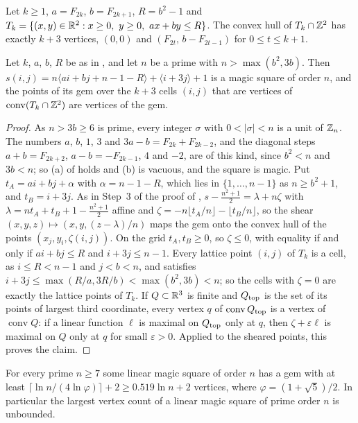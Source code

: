 \begin{lemma}
\label{lem:fib-triangle}
Let $k\ge1$, $a=F_{2k}$, $b=F_{2k+1}$, $R=b^2-1$ and $T_k=\{(x,y)\in\R^2:x\ge0,\ y\ge0,\ ax+by\le R\}$.
The convex hull of $T_k\cap\mathbb{Z}^2$ has exactly $k+3$ vertices, $(0,0)$ and $(F_{2t},\,b-F_{2t-1})$ for $0\le t\le k+1$.
\end{lemma}

\begin{proposition}
\label{prop:many-vertices}
Let $k$, $a$, $b$, $R$ be as in , and let $n$ be a prime with $n>\max(b^2,3b)$.
Then $s(i,j)=n\langle ai+bj+n-1-R\rangle+\langle i+3j\rangle+1$ is a magic square of order $n$, and the points of its gem over the $k+3$ cells $(i,j)$ that are vertices of $\operatorname{conv}(T_k\cap\mathbb{Z}^2)$ are vertices of the gem.
\end{proposition}

\begin{proof}
As $n>3b\ge6$ is prime, every integer $\sigma$ with $0<|\sigma|<n$ is a unit of $\mathbb{Z}_n$.
The numbers $a$, $b$, $1$, $3$ and $3a-b=F_{2k}+F_{2k-2}$, and the diagonal steps $a+b=F_{2k+2}$, $a-b=-F_{2k-1}$, $4$ and $-2$, are of this kind, since $b^2<n$ and $3b<n$; so (a) of  holds and (b) is vacuous, and the square is magic.
Put $t_A=ai+bj+\alpha$ with $\alpha=n-1-R$, which lies in $\{1,\dots,n-1\}$ as $n\ge b^2+1$, and $t_B=i+3j$.
As in Step~3 of the proof of , $s-\frac{n^2+1}2=\lambda+n\zeta$ with $\lambda=nt_A+t_B+1-\frac{n^2+1}2$ affine and $\zeta=-n\lfloor t_A/n\rfloor-\lfloor t_B/n\rfloor$, so the shear $(x,y,z)\mapsto(x,y,(z-\lambda)/n)$ maps the gem onto the convex hull of the points $(x_j,y_i,\zeta(i,j))$.
On the grid $t_A,t_B\ge0$, so $\zeta\le0$, with equality if and only if $ai+bj\le R$ and $i+3j\le n-1$.
Every lattice point $(i,j)$ of $T_k$ is a cell, as $i\le R<n-1$ and $j<b<n$, and satisfies $i+3j\le\max(R/a,3R/b)<\max(b^2,3b)<n$; so the cells with $\zeta=0$ are exactly the lattice points of $T_k$.
If $Q\subset\mathbb{R}^3$ is finite and $Q_{\rm top}$ is the set of its points of largest third coordinate, every vertex $q$ of $\operatorname{conv}Q_{\rm top}$ is a vertex of $\operatorname{conv}Q$: if a linear function $\ell$ is maximal on $Q_{\rm top}$ only at $q$, then $\zeta+\varepsilon\ell$ is maximal on $Q$ only at $q$ for small $\varepsilon>0$.
Applied to the sheared points, this proves the claim.
\end{proof}

\begin{corollary}
\label{cor:many-vertices}
For every prime $n\ge7$ some linear magic square of order $n$ has a gem with at least $\lceil\ln n/(4\ln\varphi)\rceil+2\ge0.519\ln n+2$ vertices, where $\varphi=(1+\sqrt5)/2$.
In particular the largest vertex count of a linear magic square of prime order $n$ is unbounded.
\end{corollary}

